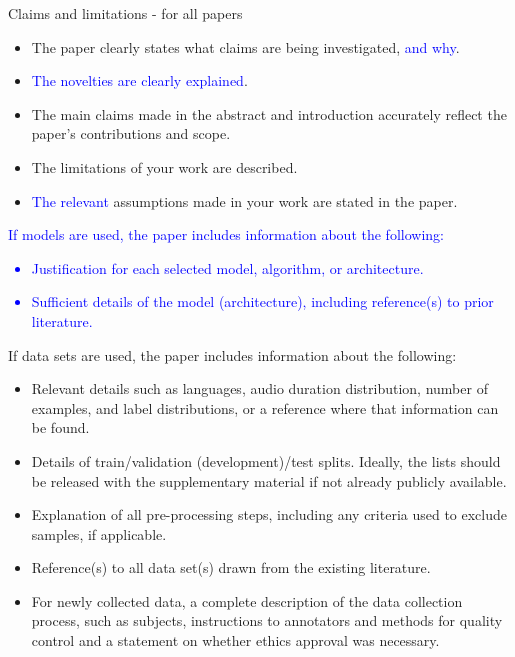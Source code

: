 \documentclass{Interspeech}
\newcommand{\blue}[1]{\textcolor{blue}{#1}}
\begin{document}
\begin{enumerate}

\item Claims and limitations - for all papers
\begin{itemize}

\item The paper clearly states what claims are being investigated, \blue{and why}.
\item \blue{The novelties are clearly explained}.
\item The main claims made in the abstract and introduction accurately reflect the paper’s contributions and scope.
\item The limitations of your work are described.
\item \blue{The relevant} assumptions made in your work are stated in the paper.
\end{itemize}

\blue{\item If models are used, the paper includes information about the following:
\begin{itemize}
    \item Justification for each selected model, algorithm, or architecture.
    \item Sufficient details of the model (architecture), including reference(s) to prior literature.
\end{itemize}}

\item If data sets are used, the paper includes information about the following:
\begin{itemize}
\item Relevant details such as languages, audio duration distribution, number of examples, and label distributions, or a reference where that information can be found.
\item Details of train/validation (development)/test splits. Ideally, the lists should be released with the supplementary material if not already publicly available.
\item Explanation of all pre-processing steps, including any criteria used to exclude samples, if applicable.
\item Reference(s) to all data set(s) drawn from the existing literature.
\item For newly collected data, a complete description of the data collection process, such as subjects, instructions to annotators and methods for quality control and a statement on whether ethics approval was necessary.
\end{itemize}


\end{enumerate}
\end{document}
